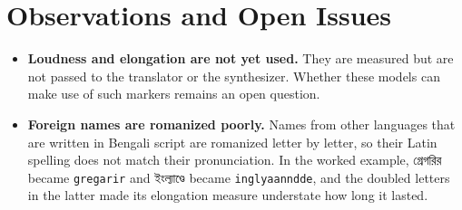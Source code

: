 \section{Observations and Open Issues}

\begin{itemize}
  \item \textbf{Loudness and elongation are not yet used.} They are measured but are not passed to the translator or the synthesizer. Whether these models can make use of such markers remains an open question.
  \item \textbf{Foreign names are romanized poorly.} Names from other languages that are written in Bengali script are romanized letter by letter, so their Latin spelling does not match their pronunciation. In the worked example, {\bn গ্রেগরির} became \texttt{gregarir} and {\bn ইংল্যাণ্ডে} became \texttt{inglyaanndde}, and the doubled letters in the latter made its elongation measure understate how long it lasted.
\end{itemize}
